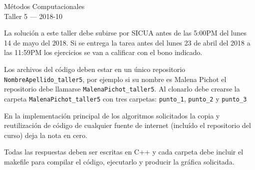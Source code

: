 \documentclass[11pt,letterpaper]{exam}
\begin{document}
\begin{center}
{\Large Métodos Computacionales} \\
Taller 5 --- 2018-10\\

\end{center}


\vspace{0.3cm}

\noindent
La solución a este taller debe subirse por SICUA antes de las 5:00PM
del lunes 14 de mayo del 2018. 
Si se entrega la tarea antes del lunes 23 de abril del 2018 a las
11:59PM los ejercicios se van a calificar con el bono indicado. 
\noindent

\vspace{0.3cm}
Los archivos del c\'odigo  deben estar en un \'unico repositorio 
\verb"NombreApellido_taller5", por ejemplo si su nombre es Malena
Pichot el repositorio debe llamarse \verb"MalenaPichot_taller5". 
Al clonarlo debe crearse la carpeta \verb"MalenaPichot_taller5"
con tres carpetas: \verb"punto_1", \verb"punto_2" y \verb"punto_3"

En la implementaci\'on principal de los algoritmos solicitados la
copia y reutilizaci\'on de c\'odigo de cualquier fuente de internet
(inclu\'ido el repositorio del curso) deja la nota en cero.  

Todas las respuestas deben ser escritas en C++ y cada carpeta debe
incluir el makefile para compilar el c\'odigo, ejecutarlo y producir
la gr\'afica solicitada.
\end{document}
